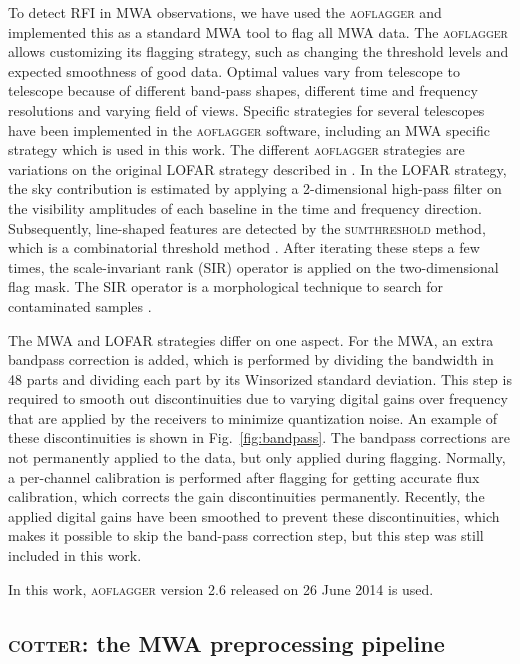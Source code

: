 \documentclass[useAMS,usenatbib]{mn2e}
\begin{document}
To detect RFI in MWA observations, we have used the \textsc{aoflagger} and implemented this as a standard MWA tool to flag all MWA data. The \textsc{aoflagger} allows customizing its flagging strategy, such as changing the threshold levels and expected smoothness of good data. Optimal values vary from telescope to telescope because of different band-pass shapes, different time and frequency resolutions and varying field of views. Specific strategies for several telescopes have been implemented in the \textsc{aoflagger} software, including an MWA specific strategy which is used in this work. The different \textsc{aoflagger} strategies are variations on the original LOFAR strategy described in \citet{lofar-radio-environment}. In the LOFAR strategy, the sky contribution is estimated by applying a 2-dimensional high-pass filter on the visibility amplitudes of each baseline in the time and frequency direction. Subsequently, line-shaped features are detected by the \textsc{sumthreshold} method, which is a combinatorial threshold method \citep{post-correlation-rfi-classification}. After iterating these steps a few times, the scale-invariant rank (SIR) operator is applied on the two-dimensional flag mask. The SIR operator is a morphological technique to search for contaminated samples \citep{scale-invariant-rank-operator}.

The MWA and LOFAR strategies differ on one aspect. For the MWA, an extra bandpass correction is added, which is performed by dividing the bandwidth in 48 parts and dividing each part by its Winsorized standard deviation. This step is required to smooth out discontinuities due to varying digital gains over frequency that are applied by the receivers to minimize quantization noise. An example of these discontinuities is shown in Fig.~\ref{fig:bandpass}. The bandpass corrections are not permanently applied to the data, but only applied during flagging. Normally, a per-channel calibration is performed after flagging for getting accurate flux calibration, which corrects the gain discontinuities permanently. Recently, the applied digital gains have been smoothed to prevent these discontinuities, which makes it possible to skip the band-pass correction step, but this step was still included in this work. 

In this work, \textsc{aoflagger} version 2.6 released on 26 June 2014 is used.

\subsection{\textsc{cotter}: the MWA preprocessing pipeline}
\end{document}
